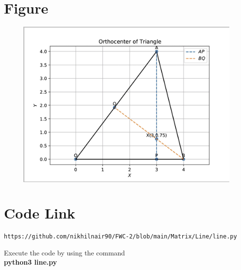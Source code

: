 \documentclass[journal,12pt,twocolumn]{IEEEtran}
\begin{document}
\section{\textbf{Figure}}
\begin{figure}[h]
    \centering
\includegraphics[width=\columnwidth]{fig.jpg}
    \label{fig:my_label}
\end{figure}


\section{\textbf{Code Link}}

\begin{lstlisting}
https://github.com/nikhilnair90/FWC-2/blob/main/Matrix/Line/line.py
\end{lstlisting}
Execute the code by using the command\\
\textbf{python3 line.py}
\end{document}
